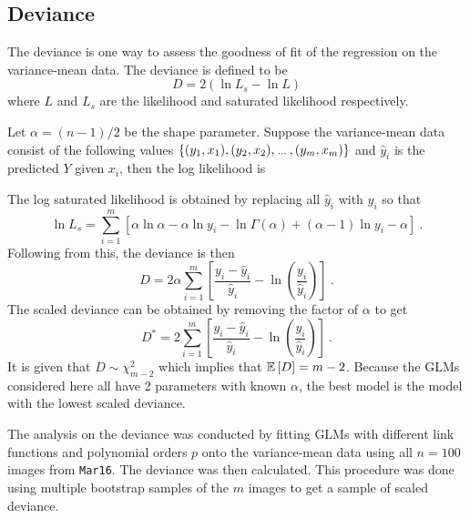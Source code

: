 \subsection{Deviance}
The deviance is one way to assess the goodness of fit of the regression on the variance-mean data. The deviance is defined to be
\begin{equation}
    D = 2\left(
        \ln L_s - \ln L    
    \right)
\end{equation}
where $L$ and $L_s$ are the likelihood and saturated likelihood respectively. 

Let $\alpha=(n-1)/2$ be the shape parameter. Suppose the variance-mean data consist of the following values $\{(y_1,x_1),(y_2,x_2),\dotdotdot,(y_m,x_m)\}$ and $\widehat{y}_i$ is the predicted $Y$ given $x_i$, then the log likelihood is

The log saturated likelihood is obtained by replacing all $\widehat{y}_i$ with $y_i$ so that
\begin{equation}
    \ln L_s = \sum_{i=1}^m \left[
        \alpha\ln\alpha
        -\alpha\ln{y_i}
        -\ln\Gamma(\alpha)
        +(\alpha-1)\ln y_i
        -\alpha
    \right]
    \ .
\end{equation}
Following from this, the deviance is then
\begin{equation}
    D = 2\alpha
    \sum_{i=1}^m\left[
        \dfrac{
            y_i-\widehat{y}_i
        }
        {
            \widehat{y}_i
        }
        - \ln\left(\dfrac{y_i}{\widehat{y}_i}\right)
    \right]
    \ .
\end{equation}
The scaled deviance can be obtained by removing the factor of $\alpha$ to get
\begin{equation}
    D^* = 2
    \sum_{i=1}^m\left[
        \dfrac{
            y_i-\widehat{y}_i
        }
        {
            \widehat{y}_i
        }
        - \ln\left(\dfrac{y_i}{\widehat{y}_i}\right)
    \right]
    \ .
\end{equation}
It is given that $D\sim\chi_{m-2}^2$ which implies that $\operatorname{\mathbb{E}}\left[D\right]=m-2$. Because the GLMs considered here all have 2 parameters with known $\alpha$, the best model is the model with the lowest scaled deviance.

The analysis on the deviance was conducted by fitting GLMs with different link functions and polynomial orders $p$ onto the variance-mean data using all $n=100$ images from \texttt{Mar16}. The deviance was then calculated. This procedure was done using multiple bootstrap samples \citep{efron1992bootstrap} of the $m$ images to get a sample of scaled deviance.

